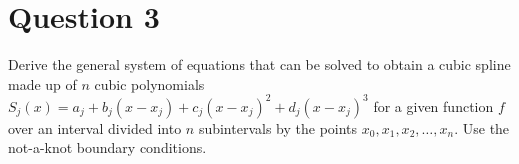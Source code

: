 \section{Question 3}

\begin{question}
    Derive the general system of equations that can be solved to obtain a cubic spline made up of $n$ cubic polynomials $S_j(x) = a_j+b_j(x-x_j)+c_j(x-x_j)^2+d_j(x-x_j)^3$ for a given function $f$ over an interval divided into $n$ subintervals by the points $x_0, x_1, x_2, \dots, x_n$. Use the not-a-knot boundary conditions.
\end{question}

\begin{answer}
    
\end{answer}